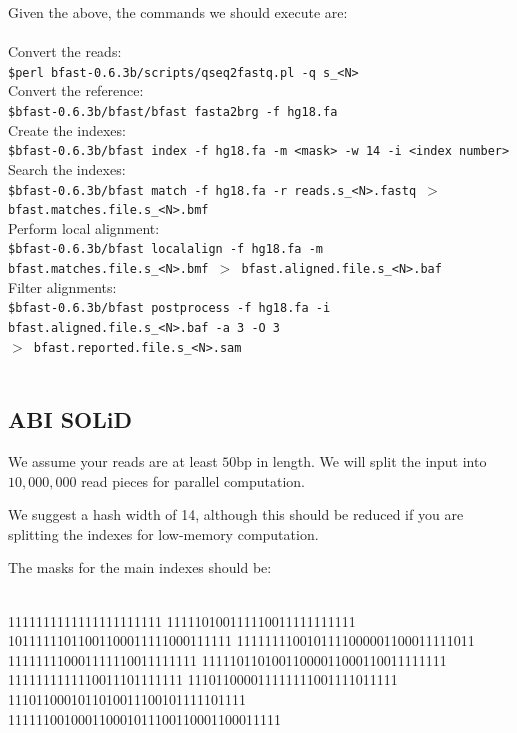 \documentclass[a4paper,12pt]{book}
\newcommand{\Version}{0.6.3b}
\begin{document}
Given the above, the commands we should execute are:
\\\\
Convert the reads:\\
{\tt \scriptsize \$perl bfast-\Version{}/scripts/qseq2fastq.pl -q s\_<N>\\}
Convert the reference:\\
{\tt \scriptsize \$bfast-\Version{}/bfast/bfast fasta2brg -f hg18.fa\\}
Create the indexes:\\
{\tt \scriptsize \$bfast-\Version{}/bfast index -f hg18.fa -m <mask> -w 14 -i <index number>\\}
Search the indexes:\\
{\tt \scriptsize \$bfast-\Version{}/bfast match -f hg18.fa -r reads.s\_<N>.fastq $>$ bfast.matches.file.s\_<N>.bmf\\}
Perform local alignment:\\
{\tt \scriptsize \$bfast-\Version{}/bfast localalign -f hg18.fa -m bfast.matches.file.s\_<N>.bmf $>$ bfast.aligned.file.s\_<N>.baf\\}
Filter alignments:\\
{\tt \scriptsize \$bfast-\Version{}/bfast postprocess -f hg18.fa -i bfast.aligned.file.s\_<N>.baf -a 3 -O 3 \\
$>$ bfast.reported.file.s\_<N>.sam\\}
\\

\subsection{ABI SOLiD}
\label{sec:hg-settings-abi}
We assume your reads are at least $50$bp in length.
We will split the input into $10,000,000$ read pieces for parallel computation.

We suggest a hash width of 14, although this should be reduced if you are splitting the indexes for low-memory computation.

The masks for the main indexes should be:\\
\\
\begin{boxedverbatim}
1111111111111111111111
111110100111110011111111111
10111111011001100011111000111111
1111111100101111000001100011111011
111111110001111110011111111
11111011010011000011000110011111111
1111111111110011101111111
111011000011111111001111011111
1110110001011010011100101111101111
111111001000110001011100110001100011111
\end{boxedverbatim}
\\
\end{document}
